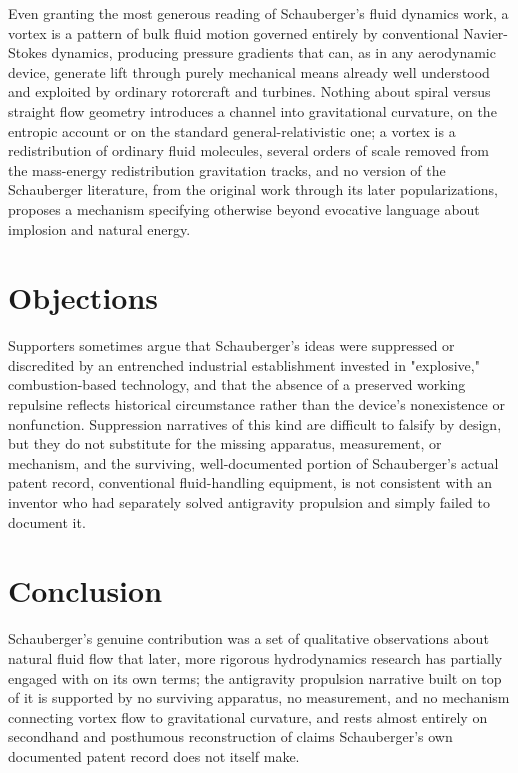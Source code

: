 \documentclass[11pt]{article}
\begin{document}
Even granting the most generous reading of Schauberger's fluid dynamics work, a vortex is a pattern of bulk fluid motion governed entirely by conventional Navier-Stokes dynamics, producing pressure gradients that can, as in any aerodynamic device, generate lift through purely mechanical means already well understood and exploited by ordinary rotorcraft and turbines. Nothing about spiral versus straight flow geometry introduces a channel into gravitational curvature, on the entropic account or on the standard general-relativistic one; a vortex is a redistribution of ordinary fluid molecules, several orders of scale removed from the mass-energy redistribution gravitation tracks, and no version of the Schauberger literature, from the original work through its later popularizations, proposes a mechanism specifying otherwise beyond evocative language about implosion and natural energy.

\section{Objections}

Supporters sometimes argue that Schauberger's ideas were suppressed or discredited by an entrenched industrial establishment invested in "explosive," combustion-based technology, and that the absence of a preserved working repulsine reflects historical circumstance rather than the device's nonexistence or nonfunction. Suppression narratives of this kind are difficult to falsify by design, but they do not substitute for the missing apparatus, measurement, or mechanism, and the surviving, well-documented portion of Schauberger's actual patent record, conventional fluid-handling equipment, is not consistent with an inventor who had separately solved antigravity propulsion and simply failed to document it.

\section{Conclusion}

Schauberger's genuine contribution was a set of qualitative observations about natural fluid flow that later, more rigorous hydrodynamics research has partially engaged with on its own terms; the antigravity propulsion narrative built on top of it is supported by no surviving apparatus, no measurement, and no mechanism connecting vortex flow to gravitational curvature, and rests almost entirely on secondhand and posthumous reconstruction of claims Schauberger's own documented patent record does not itself make.
\end{document}

